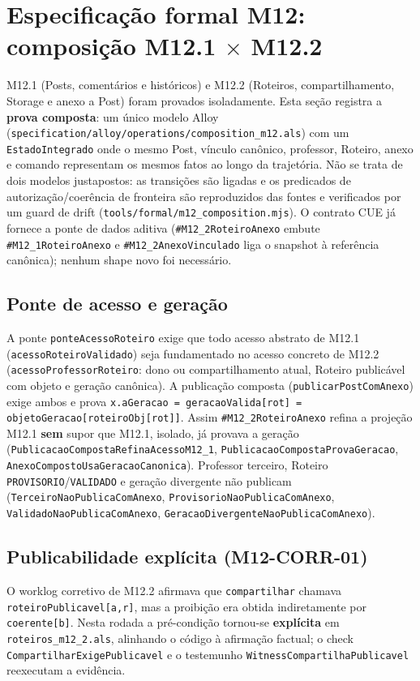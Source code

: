 \clearpage
\section{Especificação formal M12: composição M12.1 $\times$ M12.2}
\label{sec:formal-m12}
\sloppy

M12.1 (Posts, comentários e históricos) e M12.2 (Roteiros, compartilhamento,
Storage e anexo a Post) foram provados isoladamente. Esta seção registra a
\textbf{prova composta}: um único modelo Alloy
(\texttt{specification/alloy/operations/composition\_m12.als}) com um
\texttt{EstadoIntegrado} onde o mesmo Post, vínculo canônico, professor, Roteiro,
anexo e comando representam os mesmos fatos ao longo da trajetória. Não se trata
de dois modelos justapostos: as transições são ligadas e os predicados de
autorização/coerência de fronteira são reproduzidos das fontes e verificados por
um guard de drift (\texttt{tools/formal/m12\_composition.mjs}). O contrato CUE já
fornece a ponte de dados aditiva (\texttt{\#M12\_2RoteiroAnexo} embute
\texttt{\#M12\_1RoteiroAnexo} e \texttt{\#M12\_2AnexoVinculado} liga o snapshot à
referência canônica); nenhum shape novo foi necessário.

\subsection*{Ponte de acesso e geração}
A ponte \texttt{ponteAcessoRoteiro} exige que todo acesso abstrato de M12.1
(\texttt{acessoRoteiroValidado}) seja fundamentado no acesso concreto de M12.2
(\texttt{acessoProfessorRoteiro}: dono ou compartilhamento atual, Roteiro
publicável com objeto e geração canônica). A publicação composta
(\texttt{publicarPostComAnexo}) exige ambos e prova
\texttt{x.aGeracao = geracaoValida[rot] = objetoGeracao[roteiroObj[rot]]}. Assim
\texttt{\#M12\_2RoteiroAnexo} refina a projeção M12.1 \textbf{sem} supor que
M12.1, isolado, já provava a geração
(\texttt{PublicacaoCompostaRefinaAcessoM12\_1},
\texttt{PublicacaoCompostaProvaGeracao}, \texttt{AnexoCompostoUsaGeracaoCanonica}).
Professor terceiro, Roteiro \texttt{PROVISORIO}/\texttt{VALIDADO} e geração
divergente não publicam (\texttt{TerceiroNaoPublicaComAnexo},
\texttt{ProvisorioNaoPublicaComAnexo}, \texttt{ValidadoNaoPublicaComAnexo},
\texttt{GeracaoDivergenteNaoPublicaComAnexo}).

\subsection*{Publicabilidade explícita (M12-CORR-01)}
O worklog corretivo de M12.2 afirmava que \texttt{compartilhar} chamava
\texttt{roteiroPublicavel[a,r]}, mas a proibição era obtida indiretamente por
\texttt{coerente[b]}. Nesta rodada a pré-condição tornou-se \textbf{explícita} em
\texttt{roteiros\_m12\_2.als}, alinhando o código à afirmação factual; o check
\texttt{CompartilharExigePublicavel} e o testemunho
\texttt{WitnessCompartilhaPublicavel} reexecutam a evidência.

